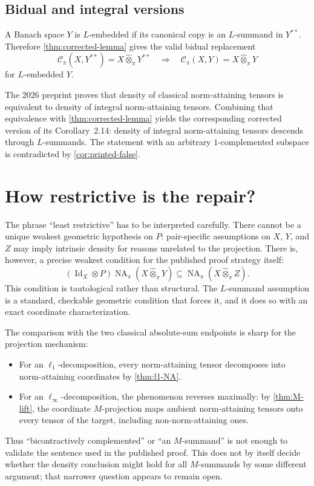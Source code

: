 \documentclass[11pt]{article}
\theoremstyle{definition}
\theoremstyle{remark}
\newcommand{\whot}{\widehat\otimes_\pi}
\newcommand{\NA}{\operatorname{NA}_\pi}
\newcommand{\Id}{\operatorname{Id}}
\newcommand{\Cpi}{\mathscr C_\pi}
\begin{document}
\subsection{Bidual and integral versions}

A Banach space $Y$ is $L$-embedded if its canonical copy is an $L$-summand in $Y^{**}$.  Therefore \cref{thm:corrected-lemma} gives the valid bidual replacement
\[
 \Cpi(X,Y^{**})=X\whot Y^{**}
 \quad\Longrightarrow\quad
 \Cpi(X,Y)=X\whot Y
\]
for $L$-embedded $Y$.

The 2026 preprint \cite{AliagaEtAl2026} proves that density of classical norm-attaining tensors is equivalent to density of integral norm-attaining tensors.  Combining that equivalence with \cref{thm:corrected-lemma} yields the corresponding corrected version of its Corollary~2.14: density of integral norm-attaining tensors descends through $L$-summands.  The statement with an arbitrary $1$-complemented subspace is contradicted by \cref{cor:printed-false}.

\section{How restrictive is the repair?}

The phrase ``least restrictive'' has to be interpreted carefully.  There cannot be a unique weakest geometric hypothesis on $P$: pair-specific assumptions on $X$, $Y$, and $Z$ may imply intrinsic density for reasons unrelated to the projection.  There is, however, a precise weakest condition for the published proof strategy itself:
\[
 (\Id_X\otimes P)\NA(X\whot Y)
 \subseteq\NA(X\whot Z).
\]
This condition is tautological rather than structural.  The $L$-summand assumption is a standard, checkable geometric condition that forces it, and it does so with an exact coordinate characterization.

The comparison with the two classical absolute-sum endpoints is sharp for the projection mechanism:
\begin{itemize}[leftmargin=2em]
\item For an $\ell_1$-decomposition, every norm-attaining tensor decomposes into norm-attaining coordinates by \cref{thm:l1-NA}.
\item For an $\ell_\infty$-decomposition, the phenomenon reverses maximally: by \cref{thm:M-lift}, the coordinate $M$-projection maps ambient norm-attaining tensors onto every tensor of the target, including non-norm-attaining ones.
\end{itemize}
Thus ``bicontractively complemented'' or ``an $M$-summand'' is not enough to validate the sentence used in the published proof.  This does not by itself decide whether the density conclusion might hold for all $M$-summands by some different argument; that narrower question appears to remain open.
\end{document}
